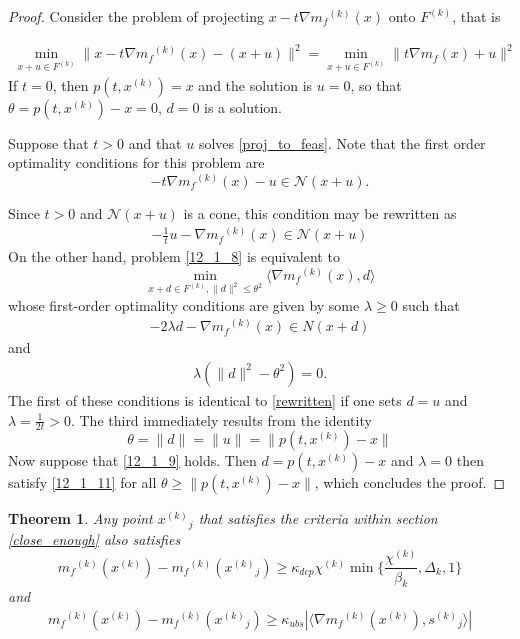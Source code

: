 \documentclass{article}
\newtheorem{theorem}{Theorem}[section]
\theoremstyle{case}
\newcommand{\modelk}{{{m}_f}^{(k)}}
\newcommand{\gradmodelk}{\nabla{{m}_f}^{(k)}}
\newcommand{\iteratek}{{x}^{(k)}}
\newcommand{\feasiblek}{{F}^{(k)}}
\newcommand{\ptx}{p(t,\iteratek)}
\newcommand{\chik}{{\chi^{(k)}}}
\newcommand{\xj}{{{x}^{(k)}}_{j}}
\newcommand{\sj}{{{s}^{(k)}}_{j}}
\begin{document}
\begin{proof}
Consider the problem of projecting $x-t\nabla \modelk(x)$ onto $\feasiblek$, that is

\begin{align}
\label{proj_to_feas}
\min_{x+u \in \feasiblek} \|x-t\nabla \modelk(x) - (x + u) \|^2 = \min_{x+u\in \feasiblek}\|t\nabla m_f(x) + u\|^2
\end{align}
If $t=0$, then $\ptx = x$ and the solution is $u=0$, so that $\theta = \ptx-x = 0$, $d=0$ is a solution.

Suppose that $t>0$ and that $u$ solves \ref{proj_to_feas}.
Note that the first order optimality conditions for this problem are
\[
-t\nabla \modelk(x)-u \in \mathcal N (x+u).
\]

Since $t>0$ and $\mathcal N(x+u)$ is a cone, this condition may be rewritten as 
\begin{align}
\label{rewritten}
-\frac 1 t u -\nabla \modelk(x) \in \mathcal N(x+u)
\end{align}
On the other hand, problem \ref{12_1_8} is equivalent to
\[\min_{x+d\in \feasiblek, \|d\|^2 \le \theta^2} \langle\nabla \modelk(x), d\rangle \]
whose first-order optimality conditions are given by some $\lambda \ge 0$ such that
\begin{align}
\label{12_1_11}
-2\lambda d-\nabla \modelk(x) \in N(x+d)
\end{align}
and
\begin{align}
\lambda(\|d\|^2-\theta^2) = 0.
\end{align}
The first of these conditions is identical to \ref{rewritten} if one sets $d=u$ and $\lambda=\frac 1 {2t}>0$.
The third immediately results from the identity 
\[
\theta=\|d\| = \|u\|=\|\ptx-x\|
\]
Now suppose that \ref{12_1_9} holds. Then $d=\ptx-x$ and $\lambda=0$ then satisfy \ref{12_1_11} for all $\theta \ge \|\ptx-x\|$, which concludes the proof.


\end{proof}





\begin{theorem}
Any point $ \xj $ that satisfies the criteria within section \ref{close_enough} also satisfies
\[
\modelk(\iteratek) - \modelk(\xj) \ge \kappa_{dcp} \chik \min\{\frac{\chik}{\beta_k}, \Delta_k, 1\}
\]
and
\begin{align}
\label{12_2_6}
\modelk(\iteratek) - \modelk(\xj) \ge \kappa_{ubs}|\langle \gradmodelk(\iteratek), \sj\rangle|
\end{align}

\end{theorem}
\end{document}
